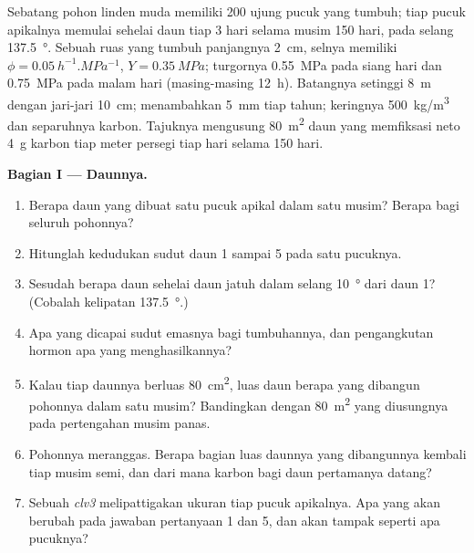 \begin{problem}
\label{pb:b2:plant-meristems:1}
Sebatang pohon linden muda memiliki \num{200} ujung pucuk yang tumbuh;
tiap pucuk apikalnya memulai sehelai daun tiap \num{3} hari selama
musim \num{150} hari, pada selang \qty{137.5}{\degree}. Sebuah ruas
yang tumbuh panjangnya \qty{2}{cm}, selnya memiliki $\phi = \qty{0.05}{h^{-1}.MPa^{-1}}$, $Y =
\qty{0.35}{MPa}$; turgornya
\qty{0.55}{MPa} pada siang hari dan \qty{0.75}{MPa} pada malam hari
(masing-masing \qty{12}{h}). Batangnya setinggi \qty{8}{m} dengan
jari-jari \qty{10}{cm};  menambahkan \qty{5}{mm} tiap tahun;
 keringnya \qty{500}{kg/m^3} dan separuhnya karbon. Tajuknya
mengusung \qty{80}{m^2} daun yang memfiksasi neto \qty{4}{g} karbon
tiap meter persegi tiap hari selama \num{150} hari.

\medskip
\noindent\textbf{Bagian I --- Daunnya.}
\begin{enumerate}
  \item Berapa daun yang dibuat satu pucuk apikal dalam satu musim?
        Berapa bagi seluruh pohonnya?
  \item Hitunglah kedudukan sudut daun 1 sampai 5 pada satu pucuknya.
  \item Sesudah berapa daun sehelai daun jatuh dalam selang
        \qty{10}{\degree} dari daun 1? (Cobalah kelipatan
        \qty{137.5}{\degree}.)
  \item Apa yang dicapai sudut emasnya bagi tumbuhannya, dan
        pengangkutan hormon apa yang menghasilkannya?
  \item Kalau tiap daunnya berluas \qty{80}{cm^2}, luas daun berapa
        yang dibangun pohonnya dalam satu musim? Bandingkan dengan
        \qty{80}{m^2} yang diusungnya pada pertengahan musim panas.
  \item Pohonnya meranggas. Berapa bagian luas daunnya yang dibangunnya
        kembali tiap musim semi, dan dari mana karbon bagi daun
        pertamanya datang?
  \item Sebuah  \emph{clv3} melipattigakan ukuran tiap pucuk
        apikalnya. Apa yang akan berubah pada jawaban pertanyaan 1 dan
        5, dan akan tampak seperti apa pucuknya?
\end{enumerate}


\end{problem}
